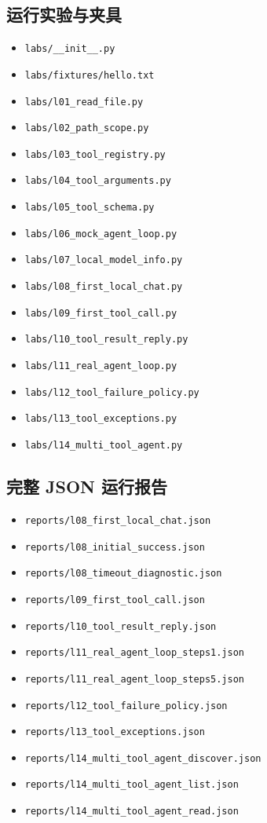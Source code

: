 \subsection{运行实验与夹具}
\begin{itemize}
\item \nolinkurl{labs/__init__.py}
\item \nolinkurl{labs/fixtures/hello.txt}
\item \nolinkurl{labs/l01_read_file.py}
\item \nolinkurl{labs/l02_path_scope.py}
\item \nolinkurl{labs/l03_tool_registry.py}
\item \nolinkurl{labs/l04_tool_arguments.py}
\item \nolinkurl{labs/l05_tool_schema.py}
\item \nolinkurl{labs/l06_mock_agent_loop.py}
\item \nolinkurl{labs/l07_local_model_info.py}
\item \nolinkurl{labs/l08_first_local_chat.py}
\item \nolinkurl{labs/l09_first_tool_call.py}
\item \nolinkurl{labs/l10_tool_result_reply.py}
\item \nolinkurl{labs/l11_real_agent_loop.py}
\item \nolinkurl{labs/l12_tool_failure_policy.py}
\item \nolinkurl{labs/l13_tool_exceptions.py}
\item \nolinkurl{labs/l14_multi_tool_agent.py}
\end{itemize}

\subsection{完整 JSON 运行报告}
\begin{itemize}
\item \nolinkurl{reports/l08_first_local_chat.json}
\item \nolinkurl{reports/l08_initial_success.json}
\item \nolinkurl{reports/l08_timeout_diagnostic.json}
\item \nolinkurl{reports/l09_first_tool_call.json}
\item \nolinkurl{reports/l10_tool_result_reply.json}
\item \nolinkurl{reports/l11_real_agent_loop_steps1.json}
\item \nolinkurl{reports/l11_real_agent_loop_steps5.json}
\item \nolinkurl{reports/l12_tool_failure_policy.json}
\item \nolinkurl{reports/l13_tool_exceptions.json}
\item \nolinkurl{reports/l14_multi_tool_agent_discover.json}
\item \nolinkurl{reports/l14_multi_tool_agent_list.json}
\item \nolinkurl{reports/l14_multi_tool_agent_read.json}
\end{itemize}

